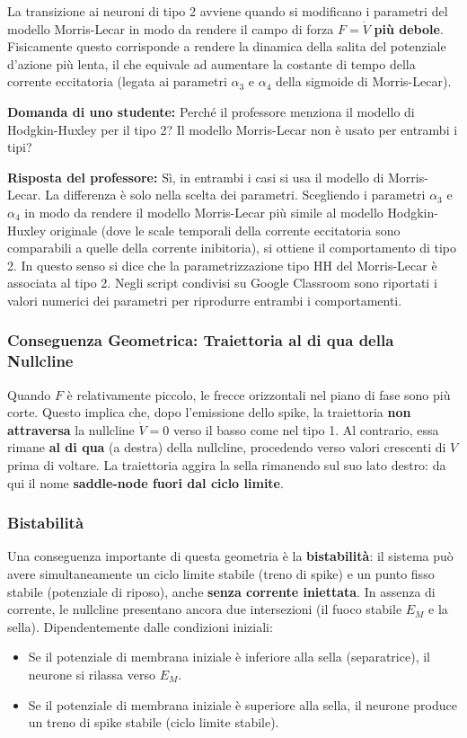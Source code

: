 La transizione ai neuroni di tipo 2 avviene quando si modificano i parametri del modello Morris-Lecar in modo da rendere il campo di forza $F = \dot{V}$ \textbf{più debole}. Fisicamente questo corrisponde a rendere la dinamica della salita del potenziale d'azione più lenta, il che equivale ad aumentare la costante di tempo della corrente eccitatoria (legata ai parametri $\alpha_3$ e $\alpha_4$ della sigmoide di Morris-Lecar).

\begin{tcolorbox}[colback=gray!5, colframe=gray!40, arc=2mm, boxrule=0.5pt]
\textbf{Domanda di uno studente:} Perché il professore menziona il modello di Hodgkin-Huxley per il tipo 2? Il modello Morris-Lecar non è usato per entrambi i tipi?

\textbf{Risposta del professore:} Sì, in entrambi i casi si usa il modello di Morris-Lecar. La differenza è solo nella scelta dei parametri. Scegliendo i parametri $\alpha_3$ e $\alpha_4$ in modo da rendere il modello Morris-Lecar più simile al modello Hodgkin-Huxley originale (dove le scale temporali della corrente eccitatoria sono comparabili a quelle della corrente inibitoria), si ottiene il comportamento di tipo 2. In questo senso si dice che la parametrizzazione tipo HH del Morris-Lecar è associata al tipo 2. Negli script condivisi su Google Classroom sono riportati i valori numerici dei parametri per riprodurre entrambi i comportamenti.
\end{tcolorbox}

\subsubsection{Conseguenza Geometrica: Traiettoria al di qua della Nullcline}
Quando $F$ è relativamente piccolo, le frecce orizzontali nel piano di fase sono più corte. Questo implica che, dopo l'emissione dello spike, la traiettoria \textbf{non attraversa} la nullcline $\dot{V}=0$ verso il basso come nel tipo 1. Al contrario, essa rimane \textbf{al di qua} (a destra) della nullcline, procedendo verso valori crescenti di $V$ prima di voltare. La traiettoria aggira la sella rimanendo sul suo lato destro: da qui il nome \textbf{saddle-node fuori dal ciclo limite}.

\subsubsection{Bistabilità}
Una conseguenza importante di questa geometria è la \textbf{bistabilità}: il sistema può avere simultaneamente un ciclo limite stabile (treno di spike) e un punto fisso stabile (potenziale di riposo), anche \textbf{senza corrente iniettata}. In assenza di corrente, le nullcline presentano ancora due intersezioni (il fuoco stabile $E_M$ e la sella). Dipendentemente dalle condizioni iniziali:
\begin{itemize}
    \item Se il potenziale di membrana iniziale è inferiore alla sella (separatrice), il neurone si rilassa verso $E_M$.
    \item Se il potenziale di membrana iniziale è superiore alla sella, il neurone produce un treno di spike stabile (ciclo limite stabile).
\end{itemize}

